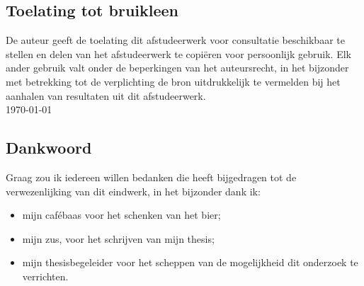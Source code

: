 \newpage
\thispagestyle{plain}
\subsection*{Toelating tot bruikleen}
De auteur geeft de toelating dit afstudeerwerk voor consultatie 
beschikbaar te stellen en delen van het afstudeerwerk te copi\"eren voor
persoonlijk gebruik. Elk ander gebruik valt onder de beperkingen van het 
auteursrecht, in het bijzonder met betrekking tot de verplichting de bron 
uitdrukkelijk te vermelden bij het aanhalen van resultaten uit dit 
afstudeerwerk.
\\[2cm]
\auteur\hfill \today
\vfill

\newpage
\thispagestyle{plain}
\subsection*{Dankwoord}
Graag zou ik iedereen willen bedanken die heeft bijgedragen tot de
verwezenlijking van dit eindwerk, in het bijzonder dank ik:
\begin{itemize}
\item mijn caf\'ebaas voor het schenken van het bier;
\item mijn zus, voor het schrijven van mijn thesis;
\item mijn thesisbegeleider \begeleider voor het scheppen van de
  mogelijkheid dit onderzoek te verrichten. 
\end{itemize}
\vfill
